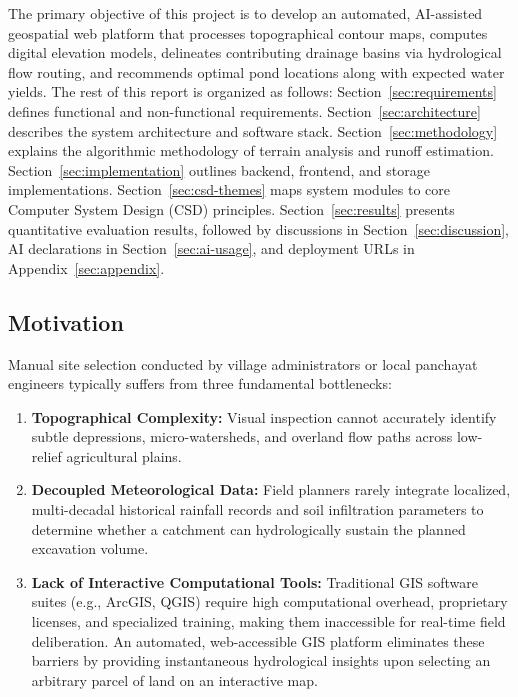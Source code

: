 \documentclass[manuscript,screen,review]{acmart}
\begin{document}
The primary objective of this project is to develop an automated, AI-assisted geospatial web platform that processes topographical contour maps, computes digital elevation models, delineates contributing drainage basins via hydrological flow routing, and recommends optimal pond locations along with expected water yields. The rest of this report is organized as follows: Section~\ref{sec:requirements} defines functional and non-functional requirements. Section~\ref{sec:architecture} describes the system architecture and software stack. Section~\ref{sec:methodology} explains the algorithmic methodology of terrain analysis and runoff estimation. Section~\ref{sec:implementation} outlines backend, frontend, and storage implementations. Section~\ref{sec:csd-themes} maps system modules to core Computer System Design (CSD) principles. Section~\ref{sec:results} presents quantitative evaluation results, followed by discussions in Section~\ref{sec:discussion}, AI declarations in Section~\ref{sec:ai-usage}, and deployment URLs in Appendix~\ref{sec:appendix}.

\subsection{Motivation}
Manual site selection conducted by village administrators or local panchayat engineers typically suffers from three fundamental bottlenecks:
\begin{enumerate}
    \item \textbf{Topographical Complexity:} Visual inspection cannot accurately identify subtle depressions, micro-watersheds, and overland flow paths across low-relief agricultural plains.
    \item \textbf{Decoupled Meteorological Data:} Field planners rarely integrate localized, multi-decadal historical rainfall records and soil infiltration parameters to determine whether a catchment can hydrologically sustain the planned excavation volume.
    \item \textbf{Lack of Interactive Computational Tools:} Traditional GIS software suites (e.g., ArcGIS, QGIS) require high computational overhead, proprietary licenses, and specialized training, making them inaccessible for real-time field deliberation. An automated, web-accessible GIS platform eliminates these barriers by providing instantaneous hydrological insights upon selecting an arbitrary parcel of land on an interactive map.
\end{enumerate}
\end{document}
